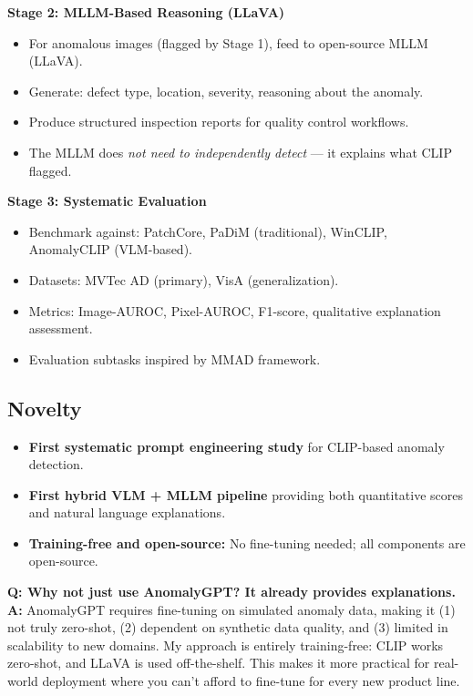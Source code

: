 \documentclass[12pt, a4paper]{article}
\begin{document}
\textbf{Stage 2: MLLM-Based Reasoning (LLaVA)}
\begin{itemize}[leftmargin=*]
    \item For anomalous images (flagged by Stage 1), feed to open-source MLLM (LLaVA).
    \item Generate: defect type, location, severity, reasoning about the anomaly.
    \item Produce structured inspection reports for quality control workflows.
    \item The MLLM does \textit{not need to independently detect} --- it explains what CLIP flagged.
\end{itemize}

\textbf{Stage 3: Systematic Evaluation}
\begin{itemize}[leftmargin=*]
    \item Benchmark against: PatchCore, PaDiM (traditional), WinCLIP, AnomalyCLIP (VLM-based).
    \item Datasets: MVTec AD (primary), VisA (generalization).
    \item Metrics: Image-AUROC, Pixel-AUROC, F1-score, qualitative explanation assessment.
    \item Evaluation subtasks inspired by MMAD framework.
\end{itemize}

\subsection{Novelty}
\begin{itemize}[leftmargin=*]
    \item \textbf{First systematic prompt engineering study} for CLIP-based anomaly detection.
    \item \textbf{First hybrid VLM + MLLM pipeline} providing both quantitative scores and natural language explanations.
    \item \textbf{Training-free and open-source:} No fine-tuning needed; all components are open-source.
\end{itemize}

\begin{vivaqa}
\textbf{Q: Why not just use AnomalyGPT? It already provides explanations.}\\[4pt]
\textbf{A:} AnomalyGPT requires fine-tuning on simulated anomaly data, making it (1) not truly zero-shot, (2) dependent on synthetic data quality, and (3) limited in scalability to new domains. My approach is entirely training-free: CLIP works zero-shot, and LLaVA is used off-the-shelf. This makes it more practical for real-world deployment where you can't afford to fine-tune for every new product line.
\end{vivaqa}
\end{document}
